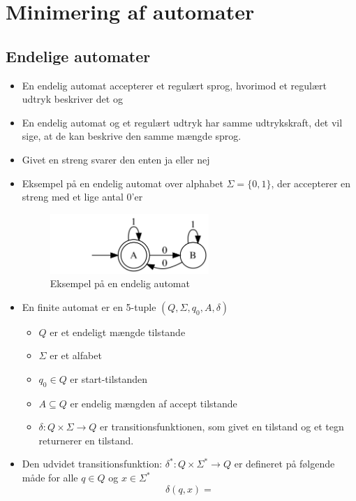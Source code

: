 \documentclass[a4, danish]{article}
\begin{document}
\section{Minimering af automater}

\subsection{Endelige automater}
  \begin{itemize}
    \item En endelig automat accepterer et regulært sprog, hvorimod et regulært udtryk beskriver det og
    \item En endelig automat og et regulært udtryk har samme udtrykskraft, det vil sige, at de kan beskrive den samme mængde sprog. 
    \item Givet en streng svarer den enten ja eller nej
    \item Eksempel på en endelig automat over alphabet $\Sigma=\{0,1\}$, der accepterer en streng med et lige antal 0'er
    \begin{figure}[ht!]
	  \centering
	  \includegraphics[width=60mm]{img/FAeks.png}
	  \caption{Eksempel på en endelig automat	\label{FAeks2}}
    \end{figure}
    \item En finite automat er en 5-tuple $(Q, \Sigma, q_0, A, \delta)$
    \begin{itemize}
	    \item $Q$ er et endeligt mængde tilstande
      \item $\Sigma$ er et alfabet
      \item $q_0 \in Q$ er start-tilstanden
      \item $A \subseteq Q$ er endelig mængden af accept tilstande
      \item $\delta: Q \times \Sigma \rightarrow Q$ er transitionsfunktionen, som givet en tilstand og et tegn returnerer en tilstand. 
    \end{itemize}
    \item Den udvidet transitionsfunktion: $\delta^*: Q \times \Sigma^* \rightarrow Q$ er defineret på følgende måde for alle $q\in Q$ og $x \in \Sigma^*$
 	 	\begin{equation*}
		\delta(q,x) =

\end{equation*}
\end{itemize}
\end{document}
